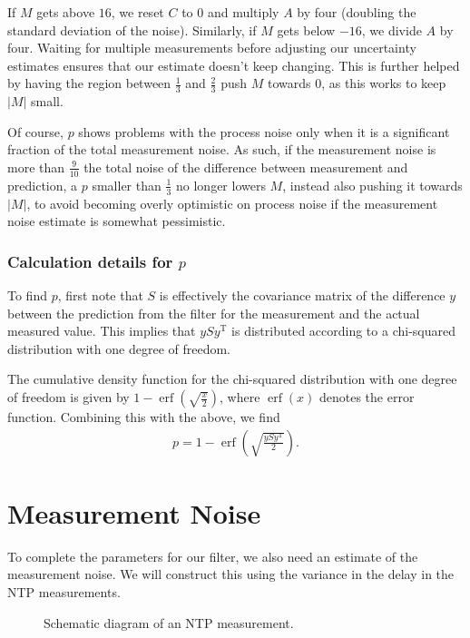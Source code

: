 \documentclass{article}
\DeclareMathOperator{\erf}{erf}
\begin{document}
If $M$ gets above $16$, we reset $C$ to $0$ and multiply $A$ by four (doubling the standard deviation of the noise).
Similarly, if $M$ gets below $-16$, we divide $A$ by four.
Waiting for multiple measurements before adjusting our uncertainty estimates ensures that our estimate doesn't keep changing.
This is further helped by having the region between $\frac{1}{3}$ and $\frac{2}{3}$ push $M$ towards $0$, as this works to keep $|M|$ small.

Of course, $p$ shows problems with the process noise only when it is a significant fraction of the total measurement noise.
As such, if the measurement noise is more than $\frac{9}{10}$ the total noise of the difference between measurement and prediction, a $p$ smaller
than $\frac{1}{3}$ no longer lowers $M$, instead also pushing it towards $|M|$, to avoid becoming overly optimistic on process noise if the
measurement noise estimate is somewhat pessimistic.

\subsubsection{Calculation details for $p$}

To find $p$, first note that $S$ is effectively the covariance matrix of the difference $y$ between the prediction from the filter for the measurement and
the actual measured value. This implies that $y S y^\mathrm{T}$ is distributed according to a chi-squared distribution with one degree of freedom.

The cumulative density function for the chi-squared distribution with one degree of freedom is given by $1-\erf\left(\sqrt{\frac{x}{2}}\right)$,
where $\erf(x)$ denotes the error function.
Combining this with the above, we find
\begin{align}
p = 1 - \erf\left(\sqrt{\frac{y S y^\mathrm{T}}{2}}\right).
\end{align}

\section{Measurement Noise}\label{sec:measnoise}

To complete the parameters for our filter, we also need an estimate of the measurement noise.
We will construct this using the variance in the delay in the NTP measurements.

\begin{figure}[h]
\caption{Schematic diagram of an NTP measurement.}\label{fig:measurement}
\end{figure}
\end{document}
